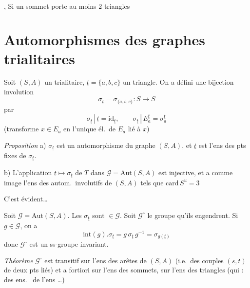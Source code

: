\documentclass[11pt,a4paper]{article}
\begin{document}

\ill{}, Si un sommet porte au moins $2$ triangles

\section{Automorphismes des graphes trialitaires}

Soit $(S,A)$ un   trialitaire,
$\underline{t}=\{a,b,c\}$ un triangle. On a défini une bijection involution
\[
  \sigma_{\underline{t}}=\sigma_{\{a,b,c\}}:S\to S
\]
par
\[
  \sigma_{\underline{t}}\,|\,\underline{t}=\mathrm{id}_{\underline{t}},\qquad
  \sigma_{\underline{t}}\,|\,E_a^{\underline{t}}=\sigma_a^{\underline{t}}
\]
(transforme $x\in E_a$ en l'unique él.\ de $E_a$ lié à $x$)

\emph{Proposition} a) $\sigma_{\underline{t}}$ est un automorphisme du
 graphe $(S,A)$, et $\underline{t}$ est l'ens des pts fixes de
$\sigma_{\underline{t}}$.

b) L'application $\underline{t}\mapsto\sigma_{\underline{t}}$ de $T$ dans
$\mathcal{G}=\mathrm{Aut}(S,A)$ est injective, et a comme image l'ens des autom.\
involutifs  de $(S,A)$ tels que 
$\mathrm{card}\,S^u=3$

C'est évident…

Soit $\mathcal{G}=\mathrm{Aut}(S,A)$. Les $\sigma_{\underline{t}}$ sont
$\in\mathcal{G}$. Soit $\mathcal{G}^{\circ}$ le groupe qu'ils engendrent. Si
$g\in\mathcal{G}$, on a
\[
  \mathrm{int}(g).\sigma_{\underline{t}}=g\,\sigma_{\underline{t}}\,g^{-1}
  =\sigma_{g(\underline{t})}
\]
donc $\mathcal{G}^{\circ}$ est un ss-groupe invariant.

\emph{Théorème} $\mathcal{G}^{\circ}$ est transitif sur l'ens des arêtes de
$(S,A)$ (i.e.\ des couples $(s,t)$ de deux pts liés) et
 a fortiori sur l'ens des sommets,
\struck{et} sur l'ens des triangles \add{ensemble} (qui \ill{} \ill{} : des ens.\
 de l'ens \ill{} …) 
\end{document}
